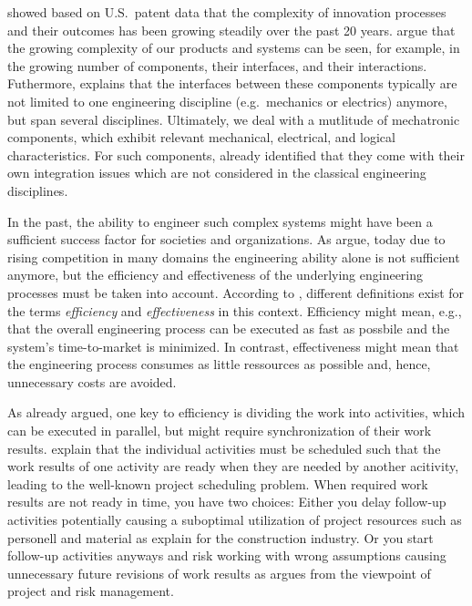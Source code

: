 \documentclass{PDS}
\begin{document}
\cite{Luo_2017} showed based on U.S.\ patent data that the complexity of innovation processes and their outcomes has been growing steadily over the past 20 years.
\cite{Trattner_2019} argue that the growing complexity of our products and systems can be seen, for example, in the growing number of components, their interfaces, and their interactions.
Futhermore, \cite{Thramboulidis_2008} explains that the interfaces between these components typically are not limited to one engineering discipline (e.g.\ mechanics or electrics) anymore, but span several disciplines.
Ultimately, we deal with a mutlitude of mechatronic components, which exhibit relevant mechanical, electrical, and logical characteristics.
For such components, \cite{Youcef_Toumi_1996} already identified that they come with their own integration issues which are not considered in the classical engineering disciplines.

In the past, the ability to engineer such complex systems might have been a sufficient success factor for societies and organizations.
As \cite{Senescu_2014} argue, today due to rising competition in many domains the engineering ability alone is not sufficient anymore, but the efficiency and effectiveness of the underlying engineering processes must be taken into account.
According to \cite{Zidane2017}, different definitions exist for the terms \textit{efficiency} and \textit{effectiveness} in this context.
Efficiency might mean, e.g., that the overall engineering process can be executed as fast as possbile and the system's time-to-market is minimized.
In contrast, effectiveness might mean that the engineering process consumes as little ressources as possible and, hence, unnecessary costs are avoided.

As \cite{Strauss_1985} already argued, one key to efficiency is dividing the work into activities, which can be executed in parallel, but might require synchronization of their work results.
\cite{Hartmann_2022} explain that the individual activities must be scheduled such that the work results of one activity are ready when they are needed by another acitivity, leading to the well-known project scheduling problem.
When required work results are not ready in time, you have two choices:
Either you delay follow-up activities potentially causing a suboptimal utilization of project resources such as personell and material as \cite{Kumaraswamy_1998} explain for the construction industry.
Or you start follow-up activities anyways and risk working with wrong assumptions causing unnecessary future revisions of work results as \cite{Chapman_2006} argues from the viewpoint of project and risk management.
\end{document}
